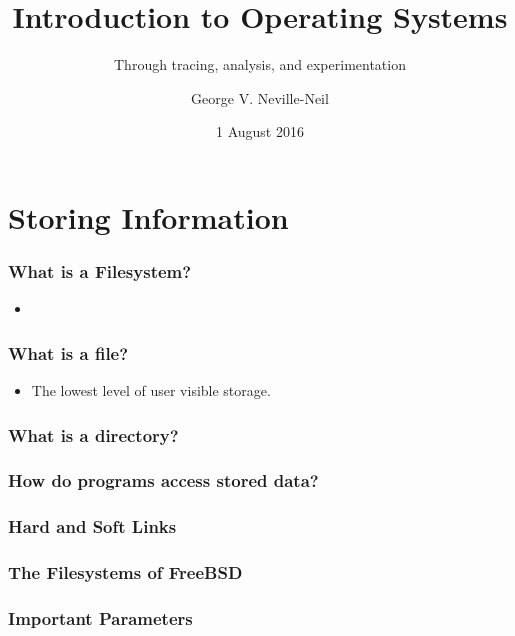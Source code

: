 \documentclass[pdftex]{beamer} %
\begin{document}

\title{Introduction to Operating Systems}
\subtitle{Through tracing, analysis, and experimentation}
\author{George V. Neville-Neil}
\date{1 August 2016}

\begin{frame}
  \titlepage
\end{frame}

\section{Storing Information}
\label{sec:storage}

\begin{frame}
  \frametitle{What is a Filesystem?}
  \begin{itemize}
  \item 
  \end{itemize}
\end{frame}

\begin{frame}
  \frametitle{What is a file?}
  \begin{itemize}
  \item The lowest level of user visible storage.
  \end{itemize}
\end{frame}

\begin{frame}
  \frametitle{What is a directory?}
  
\end{frame}

\begin{frame}
  \frametitle{How do programs access stored data?}
  
\end{frame}

\begin{frame}
  \frametitle{Hard and Soft Links}
  
\end{frame}

\begin{frame}
  \frametitle{The Filesystems of FreeBSD}
  
\end{frame}

\begin{frame}
  \frametitle{Important Parameters}
  
\end{frame}
\end{document}
